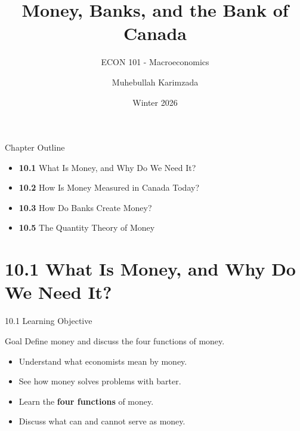 \documentclass[aspectratio=169]{beamer}
\title{\textbf{Money, Banks, and the Bank of Canada \vspace{.5cm}\\  }}
\subtitle{ {\large ECON 101 - Macroeconomics}}
\author{Muhebullah Karimzada}
\date{Winter 2026}
\begin{document}
\begin{frame}[plain]
  \titlepage
\end{frame}

\begin{frame}{Chapter Outline}
\transfade
\begin{itemize}
  \item \textbf{10.1} What Is Money, and Why Do We Need It?
  \item \textbf{10.2} How Is Money Measured in Canada Today?
  \item \textbf{10.3} How Do Banks Create Money?
  \item \textbf{10.5} The Quantity Theory of Money
\end{itemize}
\end{frame}

\section{10.1 What Is Money, and Why Do We Need It?}

\begin{frame}{10.1 Learning Objective}
\transfade
\begin{block}{Goal}
Define money and discuss the four functions of money.
\end{block}
\begin{itemize}
  \item Understand what economists mean by \alert{money}.
  \item See how money solves problems with barter.
  \item Learn the \textbf{four functions} of money.
  \item Discuss what can and cannot serve as money.
\end{itemize}
\end{frame}
\end{document}
